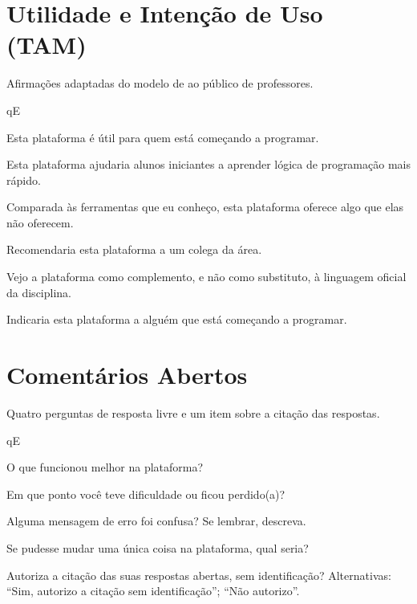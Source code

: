 \section{Utilidade e Intenção de Uso (TAM)}

Afirmações adaptadas do modelo de  ao público de professores.


\begin{questoes}{qE}
    \item\label{qE:tam-ini} Esta plataforma é útil para quem está começando a programar.
    \item Esta plataforma ajudaria alunos iniciantes a aprender lógica de programação mais rápido.
    \item Comparada às ferramentas que eu conheço, esta plataforma oferece algo que elas não oferecem.
    \item Recomendaria esta plataforma a um colega da área.
    \item Vejo a plataforma como complemento, e não como substituto, à linguagem oficial da disciplina.
    \item\label{qE:tam-fim} Indicaria esta plataforma a alguém que está começando a programar.
\end{questoes}


\section{Comentários Abertos}

Quatro perguntas de resposta livre e um item sobre a citação das respostas.


\begin{questoes}{qE}
    \item\label{qE:abertas-ini} O que funcionou melhor na plataforma?
    \item Em que ponto você teve dificuldade ou ficou perdido(a)?
    \item\label{qE:msg-aberta} Alguma mensagem de erro foi confusa? Se lembrar, descreva.
    \item Se pudesse mudar uma única coisa na plataforma, qual seria?
    \item\label{qE:abertas-fim} Autoriza a citação das suas respostas abertas, sem identificação? Alternativas: ``Sim, autorizo a citação sem identificação''; ``Não autorizo''.
\end{questoes}
